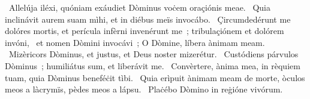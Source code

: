 {~Allelúja}
{%
iléxi, quóniam exáudiet Dòminus voċem oraçiónis meae.
~Quia inclinávit aurem suam mìhi, et in diébus meïs invocábo.
~Çircumdedérunt me dolóres mortis, et perícula infèrni invenérunt me~; tribulaçiónem et dolórem invóni,
~et nomen Dòmini invocávi~; O Dòmine, líbera ànimam meam.
~Mizèricors Dòminus, et justus, et Deus noster mizerétur.
~Custódiens párvulos Dòminus~; humiliátus sum, et liberávit me.
~Convèrtere, ànima mea, in rèquiem tuam, quia Dòminus beneféċit tìbi.
~Quia erìpuit ànimam meam de morte, òculos meos a làcrymïs, pèdes meos a lápsu.
~Plaċébo Dòmino in reġióne vivórum.
}
